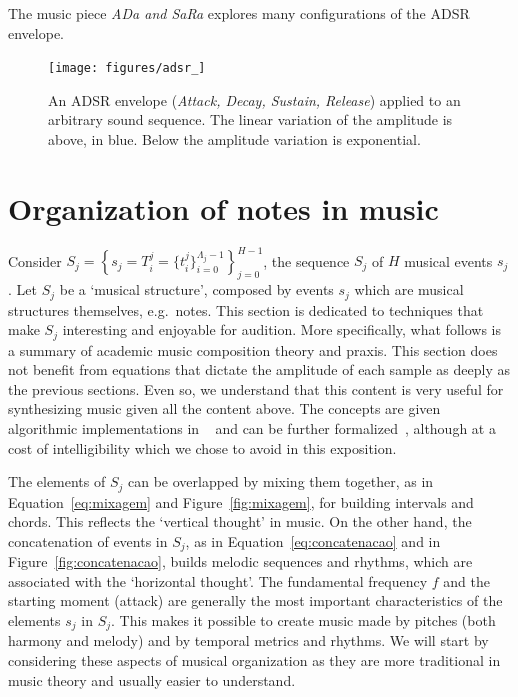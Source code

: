 The music piece \emph{ADa and SaRa} explores many configurations of the ADSR envelope.~\cite{MASSA}

\begin{figure}[htp!]
    \centering
        \texttt{[image: figures/adsr\_]}
    \caption{An ADSR envelope (\emph{Attack, Decay, Sustain, Release}) applied to an arbitrary sound sequence. The linear variation of the amplitude is above, in blue. Below the amplitude variation is exponential.}
        \label{fig:adsr}
\end{figure}





\section{Organization of notes in music}\label{notasMusica} \label{sec:notesMusic}
Consider $S_j=\left\{  s_j=T_i^j=\{t_i^j\}_{i=0}^{\Lambda_j-1} \right\}_{j=0}^{H-1}$, the sequence $S_j$ of $H$ musical events $s_j$. Let $S_j$ be a `musical structure', composed by events $s_j$ which are musical structures themselves, e.g.\ notes. This section is dedicated to techniques that make $S_j$ interesting and enjoyable for audition. More specifically, what follows is a summary of academic music composition theory and praxis.
This section does not benefit from equations that dictate the amplitude of each sample as deeply as the previous sections.
Even so, we understand that this content is very useful for synthesizing music given all the content above.
The concepts are given algorithmic implementations in \mass~\cite{SI} and can be further formalized~\cite{topos},
although at a cost of intelligibility which we chose to avoid in this exposition.

The elements of $S_j$ can be overlapped by mixing them together, as in
Equation~\ref{eq:mixagem} and Figure~\ref{fig:mixagem}, for building intervals and chords. This reflects the `vertical thought' in music. On the other hand, the concatenation of events
in $S_j$, as in Equation~\ref{eq:concatenacao} and in Figure~\ref{fig:concatenacao}, builds melodic sequences and rhythms, which are associated with the `horizontal thought'. The fundamental frequency $f$ and the starting moment
(attack) are generally the most important characteristics of the elements $s_j$ in $S_j$. This makes it possible to create music made by pitches (both harmony and melody) and by temporal metrics and rhythms.
We will start by considering these aspects of musical organization as they are more traditional in music theory and usually easier to understand.

